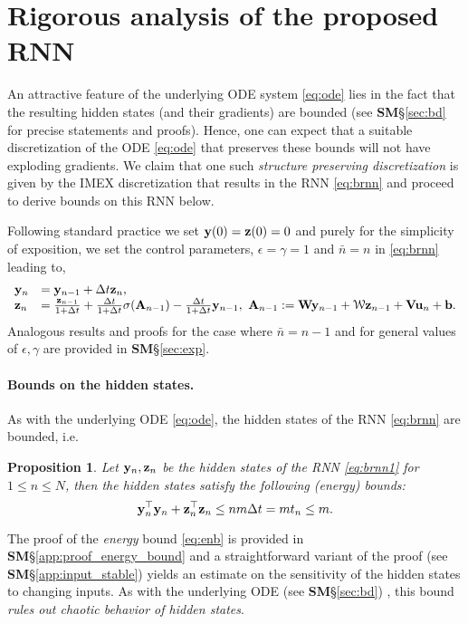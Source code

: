 \documentclass{article} \usepackage{iclr2021_conference,times}
\newtheorem{proposition}[theorem]{Proposition}
\newcommand{\cW}{\EuScript{W}}
\newcommand{\by}{{\bf y}}
\newcommand{\bz}{{\bf z}}
\newcommand{\bW}{{\bf W}}
\newcommand{\bu}{{\bf u}}
\newcommand{\bb}{{\bf b}}
\newcommand{\bV}{{\bf V}}
\newcommand{\bA}{{\bf A}}
\newcommand{\ep}{\epsilon}
\newcommand{\Dt}{{\Delta t}}
\begin{document}
\section{Rigorous analysis of the proposed RNN}
An attractive feature of the underlying ODE system \eqref{eq:ode} lies in the fact that the resulting hidden states (and their gradients) are bounded (see 
{\bf SM}\S\ref{sec:bd} for precise statements and proofs). Hence, one can expect that a suitable discretization of the ODE \eqref{eq:ode} that preserves these bounds will not have exploding gradients. We claim that one such \emph{structure preserving discretization} is given by the IMEX discretization that results in the RNN \eqref{eq:brnn} and proceed to derive bounds on this RNN below. 


Following standard practice we set $\by(0) = \bz(0) = 0$ and purely for the simplicity of exposition, we set the control parameters, $\ep=\gamma=1$ and $\bar{n}=n$ in \eqref{eq:brnn} leading to,
\begin{equation}
\label{eq:brnn1}
\begin{array}{ll}
\by_n &= \by_{n-1} + \Dt \bz_n,  \\
\bz_n &= \frac{\bz_{n-1}}{1+ \Dt}  + \frac{\Dt}{1 + \Dt}  \sigma(\bA_{n-1}) - \frac{\Dt}{1+ \Dt} \by_{n-1},~\bA_{n-1} :=  \bW\by_{n-1} +  {\bf \cW} \bz_{n-1} + \bV \bu_{n} + \bb.  
\end{array}
\end{equation}
Analogous results and proofs for the case where $\bar{n}=n-1$ and for general values of $\ep,\gamma$ are provided in {\bf SM}\S\ref{sec:exp}.
\paragraph{Bounds on the hidden states.} As with the underlying ODE \eqref{eq:ode}, the hidden states of the RNN \eqref{eq:brnn} are bounded, i.e.
\begin{proposition}
\label{prop:1}
Let $\by_n,\bz_n$ be the hidden states of the RNN \eqref{eq:brnn1} for $1\leq n \leq N$, then the hidden states satisfy the following (energy) bounds:
\begin{equation}
    \label{eq:enb}
    \by_n^\top \by_n + \bz_n^\top \bz_n \leq n m\Dt = mt_n \leq m.
\end{equation}
\end{proposition}
The proof of the \emph{energy} bound \eqref{eq:enb} is provided in {\bf SM}\S\ref{app:proof_energy_bound} and a straightforward variant of the proof (see {\bf SM}\S\ref{app:input_stable}) yields an estimate on the sensitivity of the hidden states to changing inputs. As with the underlying ODE (see {\bf SM}\S\ref{sec:bd}) , this bound \emph{rules out chaotic behavior of hidden states}.
\end{document}
